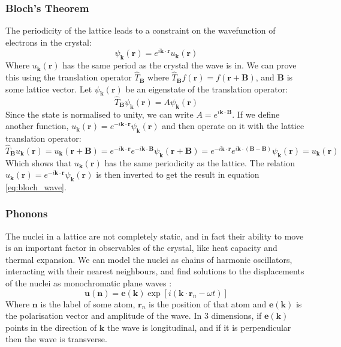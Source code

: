 \documentclass[12pt]{article}
\begin{document}
\subsubsection{Bloch's Theorem}
The periodicity of the lattice leads to a constraint on the wavefunction of electrons in the crystal:
\begin{equation}\label{eq:bloch_wave}
	\psi_\mathbf k(\mathbf r) = e^{i\mathbf{k}\cdot \mathbf{r}}u_\mathbf k(\mathbf r)
\end{equation}
Where $u_\mathbf k(\mathbf r)$ has the same period as the crystal the wave is in.
We can prove this using the translation operator $\hat T_\mathbf B$ where $\hat T_\mathbf B f(\mathbf r) = f(\mathbf r + \mathbf B)$, and $\mathbf B$ is some lattice vector. Let $\psi_\mathbf k(\mathbf r)$ be an eigenstate of the translation operator:
\begin{equation}
	\hat T_\mathbf B \psi_\mathbf k(\mathbf r) = A \psi_\mathbf k(\mathbf r)
\end{equation}
Since the state is normalised to unity, we can write $A=e^{i\mathbf k \cdot \mathbf B}$. If we define another function, $u_\mathbf k(\mathbf r) = e^{-i\mathbf k \cdot \mathbf r}\psi_\mathbf k(\mathbf r)$ and then operate on it with the lattice translation operator:
\begin{equation}\label{eq:bloch_proof}
\hat T_\mathbf B u_\mathbf k(\mathbf r) = u_\mathbf k(\mathbf r + \mathbf B) = 
e^{-i\mathbf k \cdot \mathbf r}e^{-i\mathbf k \cdot \mathbf B} \psi_\mathbf k(\mathbf r + \mathbf B) = 
e^{-i\mathbf k \cdot \mathbf r}e^{i\mathbf k \cdot (\mathbf B - \mathbf B)} \psi_\mathbf k(\mathbf r) = u_\mathbf k(\mathbf r)
\end{equation}
Which shows that $u_\mathbf k(\mathbf r)$ has the same periodicity as the lattice. The relation $u_\mathbf k(\mathbf r) = e^{-i \mathbf k \cdot \mathbf r}\psi_\mathbf k(\mathbf r)$ is then inverted to get the result in equation \ref{eq:bloch_wave}.
\subsubsection{Phonons}

The nuclei in a lattice are not completely static, and in fact their ability to move is an important factor in observables of the crystal, like heat capacity and thermal expansion. We can model the nuclei as chains of harmonic oscillators, interacting with their nearest neighbours, and find solutions to the displacements of the nuclei as monochromatic plane waves \cite{landau1980statistical}:
\begin{equation}
	\mathbf u(\mathbf n) = \mathbf e(\mathbf k) \exp{[i(\mathbf k \cdot \mathbf r_n - \omega t)]}
\end{equation}
Where $\mathbf n$ is the label of some atom, $\mathbf r_n$ is the position of that atom and $\mathbf e(\mathbf k)$ is the polarisation vector and amplitude of the wave. In 3 dimensions, if $\mathbf e(\mathbf k)$ points in the direction of $\mathbf k$ the wave is longitudinal, and if it is perpendicular then the wave is transverse.
\end{document}
